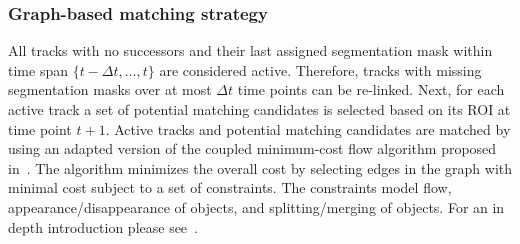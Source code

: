 \documentclass[10pt,letterpaper]{article}
\begin{document}
\subsubsection*{Graph-based matching strategy}
All tracks with no successors and their last assigned segmentation mask within time span $\{t-\Delta t, \dots, t\}$ are considered active. Therefore, tracks with missing segmentation masks over at most $\Delta t$ time points can be re-linked. Next, for each active track a set of potential matching candidates is selected based on its ROI at time point $t+1$. Active tracks and potential matching candidates are matched by using an adapted version of the coupled minimum-cost flow algorithm proposed in~\cite{Padfield2011}. The algorithm minimizes the overall cost by selecting edges in the graph with minimal cost subject to a set of constraints. The constraints model flow, appearance/disappearance of objects, and splitting/merging of objects. For an in depth introduction please see~\cite{Padfield2011}.
\end{document}
